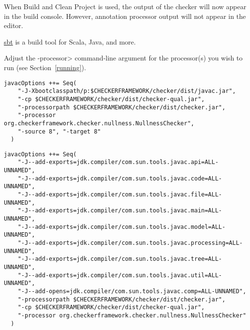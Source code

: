 \begin{enumerate}
When Build and Clean Project is used, the output of the checker will
now appear in the build console. However, annotation processor output
will not appear in the editor.

\end{enumerate}



\href{https://www.scala-sbt.org/}{sbt} is a build tool for
Scala, Java, and more.

Adjust the \<-processor> command-line argument for the processor(s)
you wish to run (see Section~\ref{running}).



\begin{Verbatim}
javacOptions ++= Seq(
    "-J-Xbootclasspath/p:$CHECKERFRAMEWORK/checker/dist/javac.jar",
    "-cp $CHECKERFRAMEWORK/checker/dist/checker-qual.jar",
    "-processorpath $CHECKERFRAMEWORK/checker/dist/checker.jar",
    "-processor org.checkerframework.checker.nullness.NullnessChecker",
    "-source 8", "-target 8"
  )
\end{Verbatim}



\begin{Verbatim}
javacOptions ++= Seq(
    "-J--add-exports=jdk.compiler/com.sun.tools.javac.api=ALL-UNNAMED",
    "-J--add-exports=jdk.compiler/com.sun.tools.javac.code=ALL-UNNAMED",
    "-J--add-exports=jdk.compiler/com.sun.tools.javac.file=ALL-UNNAMED",
    "-J--add-exports=jdk.compiler/com.sun.tools.javac.main=ALL-UNNAMED",
    "-J--add-exports=jdk.compiler/com.sun.tools.javac.model=ALL-UNNAMED",
    "-J--add-exports=jdk.compiler/com.sun.tools.javac.processing=ALL-UNNAMED",
    "-J--add-exports=jdk.compiler/com.sun.tools.javac.tree=ALL-UNNAMED",
    "-J--add-exports=jdk.compiler/com.sun.tools.javac.util=ALL-UNNAMED",
    "-J--add-opens=jdk.compiler/com.sun.tools.javac.comp=ALL-UNNAMED",
    "-processorpath $CHECKERFRAMEWORK/checker/dist/checker.jar",
    "-cp $CHECKERFRAMEWORK/checker/dist/checker-qual.jar",
    "-processor org.checkerframework.checker.nullness.NullnessChecker"
  )
\end{Verbatim}


